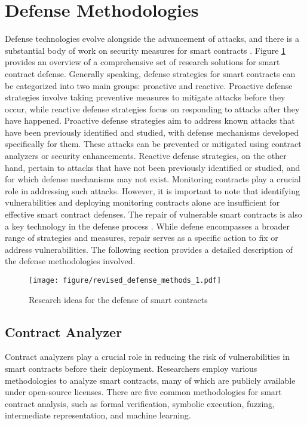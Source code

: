 \documentclass[manuscript,screen]{acmart}
\begin{document}
\section{Defense Methodologies}
\label{defense}
Defense technologies evolve alongside the advancement of attacks, and there is a substantial body of work on security measures for smart contracts \cite{zhou2020ever, ChenPNX20, TorresCS21}. 
Figure \ref{fig_defense} provides an overview of a comprehensive set of research solutions for smart contract defense. Generally speaking, defense strategies for smart contracts can be categorized into two main groups: proactive and reactive. Proactive defense strategies involve taking preventive measures to mitigate attacks before they occur, while reactive defense strategies focus on responding to attacks after they have happened. Proactive defense strategies aim to address known attacks that have been previously identified and studied, with defense mechanisms developed specifically for them. These attacks can be prevented or mitigated using contract analyzers or security enhancements. Reactive defense strategies, on the other hand, pertain to attacks that have not been previously identified or studied, and for which defense mechanisms may not exist. Monitoring contracts play a crucial role in addressing such attacks. However, it is important to note that identifying vulnerabilities and deploying monitoring contracts alone are insufficient for effective smart contract defenses. The repair of vulnerable smart contracts is also a key technology in the defense process \cite{RodlerLKD21, TorresJS22}. While defene encompasses a broader range of strategies and measures, repair serves as a specific action to fix or address vulnerabilities. 
The following section provides a detailed description of the defense methodologies involved.

\begin{figure}[!ht]
	\centering
	\texttt{[image: figure/revised\_defense\_methods\_1.pdf]}
	\caption{Research ideas for the defense of smart contracts}
	\label{fig_defense}
\end{figure}

\subsection{Contract Analyzer}
Contract analyzers play a crucial role in reducing the risk of vulnerabilities in smart contracts before their deployment. Researchers employ various methodologies to analyze smart contracts, many of which are publicly available under open-source licenses. There are five common methodologies for smart contract analysis, such as formal verification, symbolic execution, fuzzing, intermediate representation, and machine learning.
\end{document}
